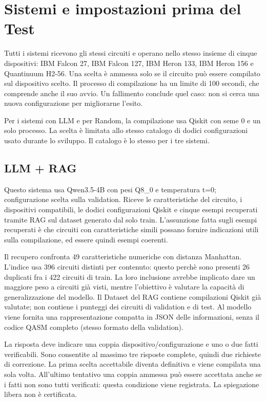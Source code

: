 \clearpage
\section{Sistemi e impostazioni prima del Test}
Tutti i sistemi ricevono gli stessi circuiti e operano nello stesso insieme
di cinque dispositivi: IBM Falcon 27, IBM Falcon 127, IBM Heron 133,
IBM Heron 156 e Quantinuum H2-56.
Una scelta è ammessa solo se il circuito può essere compilato sul dispositivo scelto.
Il processo di compilazione ha un limite di 100 secondi,
che comprende anche il suo avvio. Un fallimento conclude quel caso:
non si cerca una nuova configurazione per migliorarne l'esito.

Per i sistemi con LLM e per Random, la compilazione usa Qiskit con seme 0 e un solo
processo. La scelta è limitata allo stesso catalogo di dodici configurazioni usato durante lo sviluppo.
Il catalogo è lo stesso per i tre sistemi.

\subsection{LLM + RAG}
Questo sistema usa Qwen3.5-4B con pesi Q8\_0 e temperatura t=0;
configurazione scelta sulla validation. Riceve le caratteristiche del circuito,
i dispositivi compatibili, le dodici configurazioni Qiskit e cinque esempi
recuperati tramite RAG sul dataset generato dal solo train. L'assunzione fatta sugli esempi recuperati è che circuiti con caratteristiche
simili possano fornire indicazioni utili sulla compilazione, ed essere quindi esempi coerenti.

Il recupero confronta 49 caratteristiche numeriche con distanza Manhattan.
L'indice usa 396 circuiti distinti per contenuto: questo perchè sono presenti 26 duplicati
fra i 422 circuiti di train. La loro inclusione avrebbe implicato dare un maggiore peso a circuiti già visti, mentre l'obiettivo è valutare la capacità di generalizzazione del modello.
Il Dataset del RAG contiene compilazioni Qiskit già valutate; non contiene
i punteggi dei circuiti di validation e di test. Al modello viene fornita una rappresentazione
compatta in JSON delle informazioni, senza il codice QASM completo (stesso formato della validation).

La risposta deve indicare una coppia dispositivo/configurazione e uno o due
fatti verificabili. Sono consentite al massimo tre risposte complete,
quindi due richieste di correzione. La prima scelta accettabile diventa
definitiva e viene compilata una sola volta. All'ultimo tentativo una coppia
ammessa può essere accettata anche se i fatti non sono tutti verificati:
questa condizione viene registrata. La spiegazione libera non è certificata.

